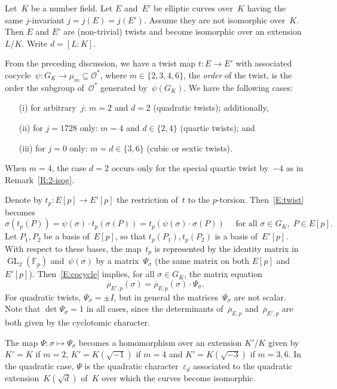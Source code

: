 \documentclass[12pt, reqno]{amsart}
\newcommand{\F}{\mathbb{F}}
\newcommand{\rhobar}{{\overline{\rho}}}
\newcommand{\calO}{\mathcal{O}}
\newcommand{\GL}{\operatorname{GL}}
\numberwithin{equation}{section}
\theoremstyle{definition}
\theoremstyle{remark}
\begin{document}
Let~$K$ be a number field. Let $E$ and~$E'$ be elliptic curves
over~$K$ having the same $j$-invariant $j = j(E) = j(E')$. Assume they
are not isomorphic over~$K$. Then $E$ and $E'$ are (non-trivial)
twists and become isomorphic over an extension $L/K$. Write $d = [L :
  K]$.

From the preceding discussion, we have a twist map $t : E \to E'$ with
associated cocycle~$\psi : G_K \to \mu_m \subseteq\calO^*$, where
$m\in\{2,3,4,6\}$, the \emph{order} of the twist, is the order the
subgroup of~$\calO^*$ generated by~$\psi(G_K)$.  We have the following
cases:
\begin{itemize}
 \item[(i)] for arbitrary~$j$: $m=2$ and $d = 2$ (quadratic twists);
   additionally,
 \item[(ii)] for $j = 1728$ only: $m=4$ and $d \in \{2,4\}$  (quartic
   twists); and
  \item[(iii)] for $j = 0$ only: $m=d\in\{3,6\}$ (cubic or sextic twists).
\end{itemize}

When $m=4$, the case $d=2$ occurs only for the special
quartic twist by~$-4$ as in Remark~\ref{R:2-isog}.

Denote by $t_p : E[p] \to E'[p]$ the restriction of~$t$ to the
$p$-torsion. Then~\eqref{E:twist} becomes
\begin{equation}\label{E:cocycle}
  \sigma(t_p(P)) = \psi(\sigma) \cdot t_p(\sigma(P))
                 = t_p(\psi(\sigma)\cdot\sigma(P)) 
   \quad \text{ for all } \sigma \in G_K,
  \; P \in E[p].
\end{equation}
Let $P_1, P_2$ be a basis of~$E[p]$, so that $t_p(P_1), t_p(P_2)$ is a
basis of~$E'[p]$.  With respect to these bases, the map~$t_p$ is
represented by the identity matrix in~$\GL_2(\F_p)$ and~$\psi(\sigma)$
by a matrix~$\Psi_\sigma$ (the same matrix on both $E[p]$
and~$E'[p]$).  Then~\eqref{E:cocycle} implies, for all $\sigma \in
G_K$, the matrix equation
\begin{equation} \label{E:PsiMatrix}
 \rhobar_{E',p}(\sigma) = \rhobar_{E,p}(\sigma) \cdot \Psi_\sigma. 
\end{equation}
For quadratic twists, $\Psi_\sigma=\pm I$, but in general the
matrices~$\Psi_\sigma$ are not scalar.  Note that
$\det\Psi_\sigma=1$ in all cases, since the determinants
of~$\rhobar_{E,p}$ and~$\rhobar_{E',p}$ are both given by the
cyclotomic character.

The map $\Psi : \sigma \mapsto \Psi_\sigma$ becomes a homomorphism
over an extension $K'/K$ given by $K'=K$ if $m=2$, $K'=K(\sqrt{-1})$
if $m=4$ and $K'=K(\sqrt{-3})$ if $m=3,6$. In the quadratic case,
$\Psi$ is the quadratic character~$\varepsilon_d$ associated to the
quadratic extension~$K(\sqrt{d})$ of~$K$ over which the curves become
isomorphic.
\end{document}
